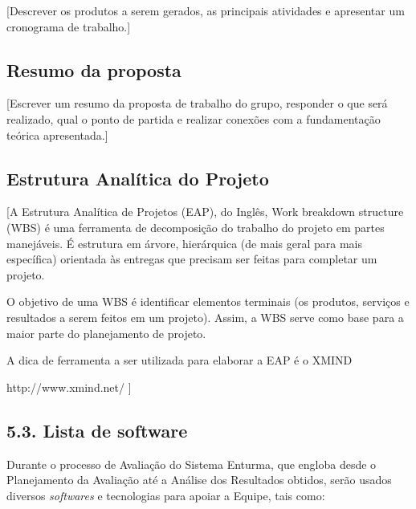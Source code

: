 
[Descrever os produtos a serem gerados, as principais atividades e apresentar um cronograma de trabalho.]

\subsection{Resumo da proposta}
	
	[Escrever um resumo da proposta de trabalho do grupo, responder o que será realizado, qual o ponto de partida e realizar conexões com a fundamentação teórica apresentada.]

\subsection{Estrutura Analítica do Projeto}
	
	[A Estrutura Analítica de Projetos (EAP), do Inglês, Work breakdown structure (WBS) é uma ferramenta de decomposição do trabalho do projeto em partes manejáveis. É estrutura em árvore, hierárquica (de mais geral para mais específica) orientada às entregas que precisam ser feitas para completar um projeto.

	O objetivo de uma WBS é identificar elementos terminais (os produtos, serviços e resultados a serem feitos em um projeto). Assim, a WBS serve como base para a maior parte do planejamento de projeto.
	
	A dica de ferramenta a ser utilizada para elaborar a EAP é o XMIND 
	
	http://www.xmind.net/ ]

\subsection{5.3. Lista de software}
	
	Durante o processo de Avaliação do Sistema Enturma, que engloba desde o Planejamento da Avaliação até a Análise dos Resultados obtidos, serão usados diversos \textit{softwares} e tecnologias para apoiar a Equipe, tais como:

